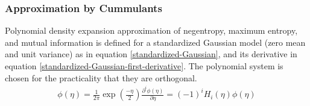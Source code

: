 \documentclass[12pt ]{article}
\begin{document}
\subsubsection{Approximation by Cummulants}
Polynomial density expansion approximation of negentropy, maximum entropy, and mutual information is defined for a standardized Gaussian model (zero mean and unit variance) as in equation \ref{standardized-Gaussian}, and its derivative in equation \ref{standardized-Gaussian-first-derivative}.  The polynomial system is chosen for the practicality that they are orthogonal.  
\begin{eqnarray}
\phi (\eta) = \frac{1}{2\pi} \exp (\frac{-\eta}{2}) \label{standardized-Gaussian}
\frac{\partial ^i \phi (\eta)} {\partial \eta} = (-1)^i H_i(\eta)\phi (\eta) \label{standardized-Gaussian-first-derivative}
\end{eqnarray}
\end{document}

